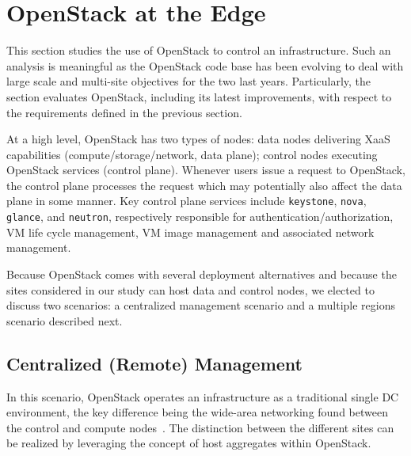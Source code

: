 \vspace*{-.1cm}
\section{OpenStack at the Edge}
\label{sec:system_design_considerations}
\vspace*{-.1cm}

%
This section studies the use of OpenStack to control an \edge
infrastructure. Such an analysis is meaningful as the OpenStack
code base has been evolving to deal with large scale and multi-site
objectives for the two last years. Particularly, the section evaluates
OpenStack, including its latest improvements, with respect to the requirements
defined in the previous section.


At a high level, OpenStack has two types of nodes: data nodes
delivering XaaS capabilities (compute/storage/network, \ie data
plane); control nodes executing OpenStack services (\ie control
plane). Whenever users issue a request to OpenStack, the control
plane processes the request which may potentially also affect the data plane in some manner. 
Key control plane services include \verb|keystone|,
\verb|nova|, \verb|glance|, and \verb|neutron|, respectively responsible for 
authentication/authorization, VM life cycle management, VM image management and
associated network management.

Because OpenStack comes with several deployment alternatives and
because the \edge sites considered in our study can host data and
control nodes, we elected to discuss two scenarios:
a centralized management scenario and a multiple regions scenario described next.

\vspace*{-.3cm}
\subsection{Centralized (Remote) Management}
\label{subsec:centralized_os}
In this scenario, OpenStack operates an \edge infrastructure
as a traditional single DC environment, %
the key difference being the wide-area networking found between the
control and compute nodes~\cite{www:openstack-wanwide}. The
distinction between the different \edge sites can be realized by leveraging the
concept of host aggregates within OpenStack.

